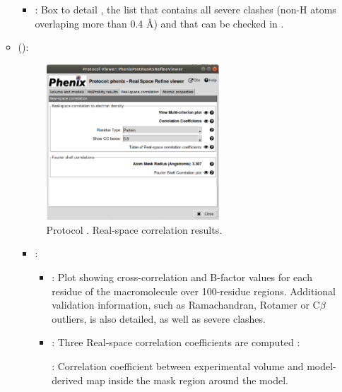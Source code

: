 \begin{itemize}
\begin{itemize}
\begin{itemize}
         \item {}: Box to detail , the list that contains all severe clashes (non-H atoms overlaping more than 0.4 \AA) and that can be checked in \coot.
        \end{itemize}
      \item {} ():
       \begin{figure}[H]
         \centering 
         \captionsetup{width=.7\linewidth} 
         \includegraphics[width=0.65\textwidth]{Images_appendix/Fig151.pdf}
         \caption{Protocol . Real-space correlation results.}
         \label{fig:app_protocol_real_space_refine_4}
        \end{figure}
        \begin{itemize}
         \item {}: 
         \begin{itemize}
          \item {}: Plot showing cross-correlation and B-factor values for each residue of the macromolecule over 100-residue regions. Additional validation information, such as Ramachandran, Rotamer or C{$\beta$} outliers, is also detailed, as well as severe clashes.  
          \item {}: Three Real-space correlation coefficients are computed \citep{afonine2018b}: \setlength{\parindent}{12pt}
          
           : Correlation coefficient between experimental volume and model-derived map inside the mask region around the model.
           

\end{itemize}
\end{itemize}
\end{itemize}
\end{itemize}
